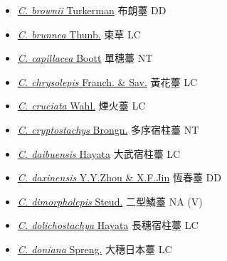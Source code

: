 \begin{itemize}
\begin{itemize}
        \item[] \href{http://www.theplantlist.org/tpl1.1/search?q=Carex+brownii}{\textit{C. brownii} Turkerman}   布朗薹   DD
        \item[] \href{http://www.theplantlist.org/tpl1.1/search?q=Carex+brunnea}{\textit{C. brunnea} Thunb.}   束草   LC
        \item[] \href{http://www.theplantlist.org/tpl1.1/search?q=Carex+capillacea}{\textit{C. capillacea} Boott}   單穗薹   NT
        \item[] \href{http://www.theplantlist.org/tpl1.1/search?q=Carex+chrysolepis}{\textit{C. chrysolepis} Franch. \& Sav.}   黃花薹   LC
        \item[] \href{http://www.theplantlist.org/tpl1.1/search?q=Carex+cruciata}{\textit{C. cruciata} Wahl.}   煙火薹   LC
        \item[] \href{http://www.theplantlist.org/tpl1.1/search?q=Carex+cryptostachys}{\textit{C. cryptostachys} Brongn.}   多序宿柱薹   NT
        \item[] \href{http://www.theplantlist.org/tpl1.1/search?q=Carex+daibuensis}{\textit{C. daibuensis} Hayata}   大武宿柱薹   LC
        \item[] \href{http://www.theplantlist.org/tpl1.1/search?q=Carex+daxinensis}{\textit{C. daxinensis} Y.Y.Zhou \& X.F.Jin}   恆春薹   DD
        \item[] \href{http://www.theplantlist.org/tpl1.1/search?q=Carex+dimorpholepis}{\textit{C. dimorpholepis} Steud.}   二型鱗薹   NA (V)
        \item[] \href{http://www.theplantlist.org/tpl1.1/search?q=Carex+dolichostachya}{\textit{C. dolichostachya} Hayata}   長穗宿柱薹   LC
        \item[] \href{http://www.theplantlist.org/tpl1.1/search?q=Carex+doniana}{\textit{C. doniana} Spreng.}   大穗日本薹   LC

\end{itemize}
\end{itemize}
